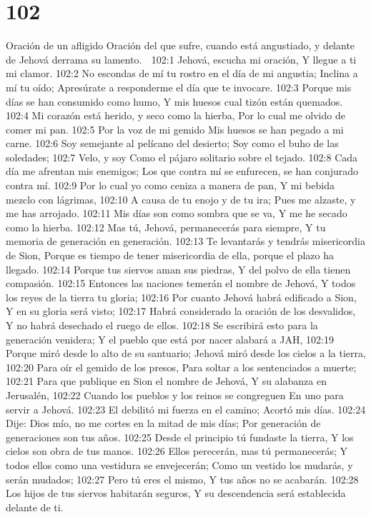 \chapter{102}

Oración de un afligido 
Oración del que sufre, cuando está angustiado, y delante de Jehová derrama su lamento. 

102:1 Jehová, escucha mi oración, 
Y llegue a ti mi clamor. 
102:2 No escondas de mí tu rostro en el día de mi angustia; 
Inclina a mí tu oído; 
Apresúrate a responderme el día que te invocare. 
102:3 Porque mis días se han consumido como humo, 
Y mis huesos cual tizón están quemados. 
102:4 Mi corazón está herido, y seco como la hierba, 
Por lo cual me olvido de comer mi pan. 
102:5 Por la voz de mi gemido 
Mis huesos se han pegado a mi carne. 
102:6 Soy semejante al pelícano del desierto; 
Soy como el buho de las soledades; 
102:7 Velo, y soy 
Como el pájaro solitario sobre el tejado. 
102:8 Cada día me afrentan mis enemigos; 
Los que contra mí se enfurecen, se han conjurado contra mí. 
102:9 Por lo cual yo como ceniza a manera de pan, 
Y mi bebida mezclo con lágrimas, 
102:10 A causa de tu enojo y de tu ira; 
Pues me alzaste, y me has arrojado. 
102:11 Mis días son como sombra que se va, 
Y me he secado como la hierba. 
102:12 Mas tú, Jehová, permanecerás para siempre, 
Y tu memoria de generación en generación. 
102:13 Te levantarás y tendrás misericordia de Sion, 
Porque es tiempo de tener misericordia de ella, porque el plazo ha llegado. 
102:14 Porque tus siervos aman sus piedras, 
Y del polvo de ella tienen compasión. 
102:15 Entonces las naciones temerán el nombre de Jehová, 
Y todos los reyes de la tierra tu gloria; 
102:16 Por cuanto Jehová habrá edificado a Sion, 
Y en su gloria será visto; 
102:17 Habrá considerado la oración de los desvalidos, 
Y no habrá desechado el ruego de ellos. 
102:18 Se escribirá esto para la generación venidera; 
Y el pueblo que está por nacer alabará a JAH, 
102:19 Porque miró desde lo alto de su santuario; 
Jehová miró desde los cielos a la tierra, 
102:20 Para oír el gemido de los presos, 
Para soltar a los sentenciados a muerte; 
102:21 Para que publique en Sion el nombre de Jehová, 
Y su alabanza en Jerusalén, 
102:22 Cuando los pueblos y los reinos se congreguen 
En uno para servir a Jehová. 
102:23 El debilitó mi fuerza en el camino; 
Acortó mis días. 
102:24 Dije: Dios mío, no me cortes en la mitad de mis días; 
Por generación de generaciones son tus años. 
102:25 Desde el principio tú fundaste la tierra, 
Y los cielos son obra de tus manos. 
102:26 Ellos perecerán, mas tú permanecerás; 
Y todos ellos como una vestidura se envejecerán; 
Como un vestido los mudarás, y serán mudados; 
102:27 Pero tú eres el mismo, 
Y tus años no se acabarán. 
102:28 Los hijos de tus siervos habitarán seguros, 
Y su descendencia será establecida delante de ti. 

